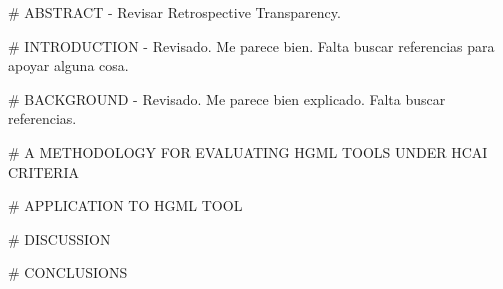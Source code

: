 # ABSTRACT
- Revisar Retrospective Transparency.

# INTRODUCTION
- Revisado. Me parece bien. Falta buscar referencias para apoyar alguna cosa.

# BACKGROUND
- Revisado. Me parece bien explicado. Falta buscar referencias.

# A METHODOLOGY FOR EVALUATING HGML TOOLS UNDER HCAI CRITERIA

# APPLICATION TO HGML TOOL

# DISCUSSION

# CONCLUSIONS